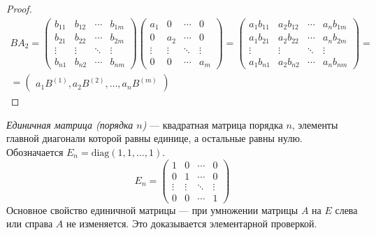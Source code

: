 \documentclass[a4paper, 12pt]{article}
\begin{document}
\begin{proof}
\begin{multline*}
BA_2 = 
\begin{pmatrix}
b_{11} & b_{12} & \cdots & b_{1m} \\
b_{21} & b_{22} & \cdots & b_{2m} \\
\vdots & \vdots & \ddots & \vdots \\
b_{n1} & b_{n2} & \cdots & b_{nm}
\end{pmatrix}
\begin{pmatrix}
a_1 & 0 & \cdots & 0 \\
0 & a_2 & \cdots & 0 \\         
\vdots & \vdots & \ddots & \vdots \\
0 & 0 & \cdots  & a_m
\end{pmatrix} = 
\begin{pmatrix}
a_1b_{11} & a_2b_{12} & \cdots & a_nb_{1m} \\
a_1b_{21} & a_2b_{22} & \cdots & a_nb_{2m} \\
\vdots & \vdots & \ddots & \vdots \\
a_1b_{n1} & a_2b_{n2} & \cdots & a_nb_{nm}
\end{pmatrix} = \\
= \begin{pmatrix}a_1B^{(1)}, a_2B^{(2)}, \ldots, a_nB^{(m)}\end{pmatrix}
\end{multline*}
\end{proof}

\vspace{0.5cm}
\textit{Единичная матрица (порядка $n$)} --- квадратная матрица порядка $n$, элементы главной диагонали которой равны единице, а остальные равны нулю. Обозначается $E_n = \mathrm{diag}(1, 1, \ldots, 1)$.
\[E_n = 
\begin{pmatrix}
1 & 0 & \cdots & 0 \\
0 & 1 & \cdots & 0 \\         
\vdots & \vdots & \ddots & \vdots \\
0 & 0 & \cdots  & 1
\end{pmatrix}
\]
Основное свойство единичной матрицы --- при умножении матрицы $A$ на $E$ слева или справа $A$ не изменяется. Это доказывается элементарной проверкой.


\end{document}
